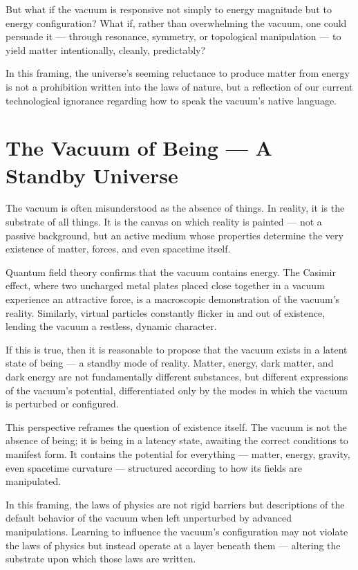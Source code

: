 \documentclass[12pt,a4paper]{article}
\begin{document}
But what if the vacuum is responsive not simply to energy magnitude but to energy configuration? What if, rather than overwhelming the vacuum, one could persuade it — through resonance, symmetry, or topological manipulation — to yield matter intentionally, cleanly, predictably?

In this framing, the universe's seeming reluctance to produce matter from energy is not a prohibition written into the laws of nature, but a reflection of our current technological ignorance regarding how to speak the vacuum's native language.

\section{The Vacuum of Being — A Standby Universe}

The vacuum is often misunderstood as the absence of things. In reality, it is the substrate of all things. It is the canvas on which reality is painted — not a passive background, but an active medium whose properties determine the very existence of matter, forces, and even spacetime itself.

Quantum field theory confirms that the vacuum contains energy. The Casimir effect, where two uncharged metal plates placed close together in a vacuum experience an attractive force, is a macroscopic demonstration of the vacuum's reality. Similarly, virtual particles constantly flicker in and out of existence, lending the vacuum a restless, dynamic character.

If this is true, then it is reasonable to propose that the vacuum exists in a latent state of being — a standby mode of reality. Matter, energy, dark matter, and dark energy are not fundamentally different substances, but different expressions of the vacuum's potential, differentiated only by the modes in which the vacuum is perturbed or configured.

This perspective reframes the question of existence itself. The vacuum is not the absence of being; it is being in a latency state, awaiting the correct conditions to manifest form. It contains the potential for everything — matter, energy, gravity, even spacetime curvature — structured according to how its fields are manipulated.

In this framing, the laws of physics are not rigid barriers but descriptions of the default behavior of the vacuum when left unperturbed by advanced manipulations. Learning to influence the vacuum's configuration may not violate the laws of physics but instead operate at a layer beneath them — altering the substrate upon which those laws are written.
\end{document}
